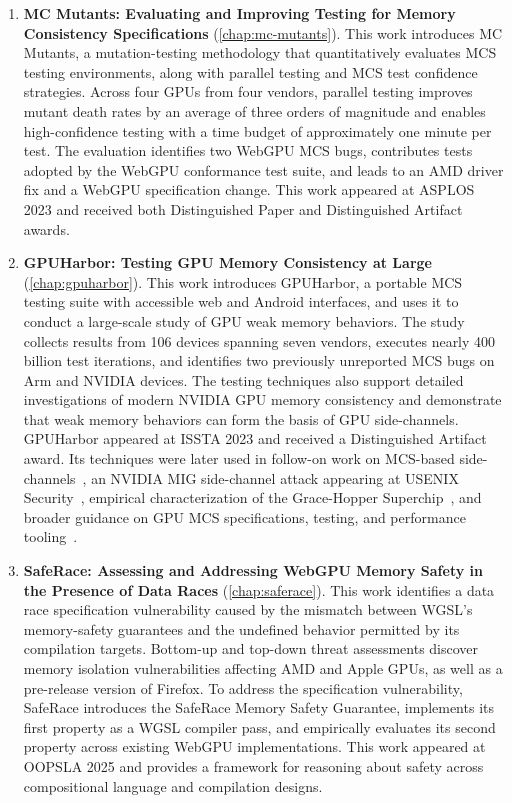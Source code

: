 \begin{enumerate}
    \item \textbf{MC Mutants: Evaluating and Improving Testing for Memory Consistency Specifications} (\mychap\ref{chap:mc-mutants}). This work introduces MC Mutants, a mutation-testing methodology that quantitatively evaluates MCS testing environments, along with parallel testing and MCS test confidence strategies. Across four GPUs from four vendors, parallel testing improves mutant death rates by an average of three orders of magnitude and enables high-confidence testing with a time budget of approximately one minute per test. The evaluation identifies two WebGPU MCS bugs, contributes tests adopted by the WebGPU conformance test suite, and leads to an AMD driver fix and a WebGPU specification change. This work appeared at ASPLOS 2023 and received both Distinguished Paper and Distinguished Artifact awards.

    \item \textbf{GPUHarbor: Testing GPU Memory Consistency at Large} (\mychap\ref{chap:gpuharbor}). This work introduces GPUHarbor, a portable MCS testing suite with accessible web and Android interfaces, and uses it to conduct a large-scale study of GPU weak memory behaviors. The study collects results from 106 devices spanning seven vendors, executes nearly 400 billion test iterations, and identifies two previously unreported MCS bugs on Arm and NVIDIA devices. The testing techniques also support detailed investigations of modern NVIDIA GPU memory consistency and demonstrate that weak memory behaviors can form the basis of GPU side-channels. GPUHarbor appeared at ISSTA 2023 and received a Distinguished Artifact award. Its techniques were later used in follow-on work on MCS-based side-channels~\cite{siddens2026disorder}, an NVIDIA MIG side-channel attack appearing at USENIX Security~\cite{gu2026behindbars}, empirical characterization of the Grace-Hopper Superchip~\cite{bagchi2026gh}, and broader guidance on GPU MCS specifications, testing, and performance tooling~\cite{basu2025gpu-mcs-blog}.

    \item \textbf{SafeRace: Assessing and Addressing WebGPU Memory Safety in the Presence of Data Races} (\mychap\ref{chap:saferace}). This work identifies a data race specification vulnerability caused by the mismatch between WGSL's memory-safety guarantees and the undefined behavior permitted by its compilation targets. Bottom-up and top-down threat assessments discover memory isolation vulnerabilities affecting AMD and Apple GPUs, as well as a pre-release version of Firefox. To address the specification vulnerability, SafeRace introduces the SafeRace Memory Safety Guarantee, implements its first property as a WGSL compiler pass, and empirically evaluates its second property across existing WebGPU implementations. This work appeared at OOPSLA 2025 and provides a framework for reasoning about safety across compositional language and compilation designs.
\end{enumerate}

